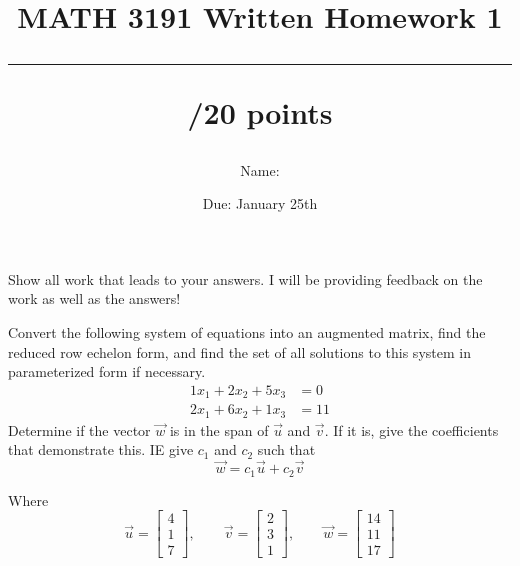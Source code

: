 \documentclass{exam}
\title{MATH 3191 Written Homework 1\\\rule{30pt}{1pt}/20 points}
\author{Name: \rule{150pt}{1pt}}
\date{Due: January 25th}
\begin{document}
\maketitle
Show all work that leads to your answers. I will be providing feedback on the work as well as the answers!
\begin{questions}
    \question[10] Convert the following system of equations into an augmented matrix, find the
    reduced row echelon form, and find the set of all solutions to this system in parameterized form
    if necessary.
    \begin{align*}
        1x_1 + 2x_2 + 5x_3 &= 0 \\
        2x_1 + 6x_2 + 1x_3 &= 11
    \end{align*}
    \newpage
    \question[10] Determine if the vector $\vec{w}$ is in the span of $\vec{u}$ and $\vec{v}$. If
    it is, give the coefficients that demonstrate this. IE give $c_1$ and $c_2$ such that
    $$\vec{w} = c_1\vec{u} + c_2\vec{v}$$

    Where
    \[
        \vec{u} = \begin{bmatrix}
            4 \\
            1 \\
            7
        \end{bmatrix},\qquad
        \vec{v} = \begin{bmatrix}
            2 \\
            3 \\
            1
        \end{bmatrix},\qquad
        \vec{w} = \begin{bmatrix}
            14 \\
            11 \\
            17
        \end{bmatrix}
    \]
\end{questions}
\end{document}
